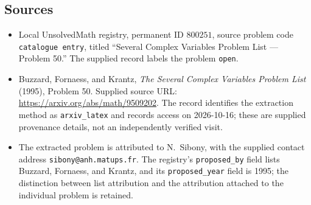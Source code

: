 \documentclass[11pt]{article}
\begin{document}
\subsection{Sources}
\begin{itemize}
\item Local UnsolvedMath registry, permanent ID \(800251\), source problem code \texttt{catalogue entry}, titled ``Several Complex Variables Problem List --- Problem 50.'' The supplied record labels the problem \texttt{open}.
\item Buzzard, Fornaess, and Krantz, \emph{The Several Complex Variables Problem List} (1995), Problem 50. Supplied source URL: \url{https://arxiv.org/abs/math/9509202}. The record identifies the extraction method as \texttt{arxiv\_latex} and records access on 2026-10-16; these are supplied provenance details, not an independently verified visit.
\item The extracted problem is attributed to N.~Sibony, with the supplied contact address \texttt{sibony@anh.matups.fr}. The registry's \texttt{proposed\_by} field lists Buzzard, Fornaess, and Krantz, and its \texttt{proposed\_year} field is 1995; the distinction between list attribution and the attribution attached to the individual problem is retained.
\end{itemize}
\end{document}
